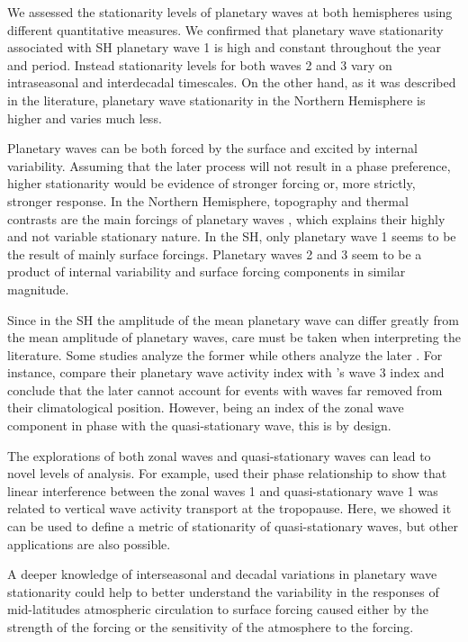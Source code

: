 \documentclass[draft,linenumbers]{agujournal2018}
\begin{document}
We assessed the stationarity levels of planetary waves at both
hemispheres using different quantitative measures. We confirmed that
planetary wave stationarity associated with SH planetary wave 1 is high
and constant throughout the year and period. Instead stationarity levels
for both waves 2 and 3 vary on intraseasonal and interdecadal
timescales. On the other hand, as it was described in the literature,
planetary wave stationarity in the Northern Hemisphere is higher and
varies much less.

Planetary waves can be both forced by the surface and excited by
internal variability. Assuming that the later process will not result in
a phase preference, higher stationarity would be evidence of stronger
forcing or, more strictly, stronger response. In the Northern
Hemisphere, topography and thermal contrasts are the main forcings of
planetary waves \citep{chen1988}, which explains their highly and not
variable stationary nature. In the SH, only planetary wave 1 seems to be
the result of mainly surface forcings. Planetary waves 2 and 3 seem to
be a product of internal variability and surface forcing components in
similar magnitude.

Since in the SH the amplitude of the mean planetary wave can differ
greatly from the mean amplitude of planetary waves, care must be taken
when interpreting the literature. Some studies analyze the former
\citep[e.g.~][\citet{quintanar1995a}, \citet{raphael2004}]{vanloon1972}
while others analyze the later \citep[e.g.~][\citet{turner2017},
\citet{irving2015}]{rao2004}. For instance, \citet{irving2015} compare
their planetary wave activity index with \citet{raphael2004}'s wave 3
index and conclude that the later cannot account for events with waves
far removed from their climatological position. However, being an index
of the zonal wave component in phase with the quasi-stationary wave,
this is by design.

The explorations of both zonal waves and quasi-stationary waves can lead
to novel levels of analysis. For example, \citet{smith2012} used their
phase relationship to show that linear interference between the zonal
waves 1 and quasi-stationary wave 1 was related to vertical wave
activity transport at the tropopause. Here, we showed it can be used to
define a metric of stationarity of quasi-stationary waves, but other
applications are also possible.

A deeper knowledge of interseasonal and decadal variations in planetary
wave stationarity could help to better understand the variability in the
responses of mid-latitudes atmospheric circulation to surface forcing
caused either by the strength of the forcing or the sensitivity of the
atmosphere to the forcing.
\end{document}
